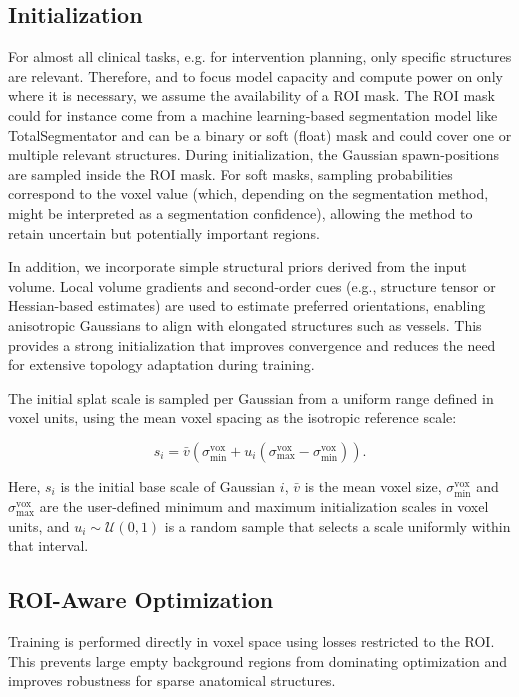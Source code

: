 \documentclass[runningheads]{llncs}
\begin{document}
\subsection{Initialization}

For almost all clinical tasks, e.g. for intervention planning, only specific structures are relevant. Therefore, and to focus model capacity and compute power on only where it is necessary, we assume the availability of a ROI mask. The ROI mask could for instance come from a machine learning-based segmentation model like TotalSegmentator and can be a binary or soft (float) mask and could cover one or multiple relevant structures. During initialization, the Gaussian spawn-positions are sampled inside the ROI mask. For soft masks, sampling probabilities correspond to the voxel value (which, depending on the segmentation method, might be interpreted as a segmentation confidence), allowing the method to retain uncertain but potentially important regions.

In addition, we incorporate simple structural priors derived from the input volume. Local volume gradients and second-order cues (e.g., structure tensor or Hessian-based estimates) are used to estimate preferred orientations, enabling anisotropic Gaussians to align with elongated structures such as vessels. This provides a strong initialization that improves convergence and reduces the need for extensive topology adaptation during training.

The initial splat scale is sampled per Gaussian from a uniform range defined in voxel units, using the mean voxel spacing as the isotropic reference scale:

\begin{equation}
s_i=\bar v\left(\sigma_{\min}^{\mathrm{vox}}+u_i\left(\sigma_{\max}^{\mathrm{vox}}-\sigma_{\min}^{\mathrm{vox}}\right)\right).
\end{equation}

Here, $s_i$ is the initial base scale of Gaussian $i$, $\bar v$ is the mean voxel size, $\sigma_{\min}^{\mathrm{vox}}$ and $\sigma_{\max}^{\mathrm{vox}}$ are the user-defined minimum and maximum initialization scales in voxel units, and $u_i \sim \mathcal{U}(0,1)$ is a random sample that selects a scale uniformly within that interval.

\subsection{ROI-Aware Optimization}
Training is performed directly in voxel space using losses restricted to the ROI. This prevents large empty background regions from dominating optimization and improves robustness for sparse anatomical structures.
\end{document}
